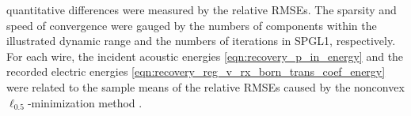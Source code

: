 quantitative differences were measured by
the relative \acp{RMSE}.
The sparsity and
speed of
convergence were gauged by
the numbers of
components within
the illustrated dynamic range and
the numbers of
iterations in
\ac{SPGL1},
respectively.
For
each wire,
the incident acoustic energies
\eqref{eqn:recovery_p_in_energy} and
the recorded electric energies
\eqref{eqn:recovery_reg_v_rx_born_trans_coef_energy} were related to
the sample means of
the relative \acp{RMSE} caused by
the nonconvex $\ell_{0.5}$-minimization method
.
